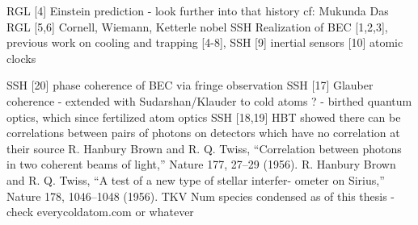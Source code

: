 		RGL [4] Einstein prediction - look further into that history cf: Mukunda Das 
	RGL [5,6] Cornell, Wiemann, Ketterle nobel 
	SSH  Realization of BEC [1,2,3], previous work on cooling and trapping [4-8], 
	SSH [9] inertial sensors [10] atomic clocks 
	
	
	SSH [20] phase coherence of BEC via fringe observation 
	SSH [17] Glauber coherence - extended with Sudarshan/Klauder to cold atoms ? - birthed quantum optics, which since fertilized atom optics 
	SSH [18,19] HBT showed there can be correlations between pairs of photons on detectors which have no correlation at their source  
	R. Hanbury Brown and R. Q. Twiss, “Correlation between photons in two coherent beams of light,” Nature 177, 27–29 (1956).
	R. Hanbury Brown and R. Q. Twiss, “A test of a new type of stellar interfer- ometer on Sirius,” Nature 178, 1046–1048 (1956).
	TKV Num species condensed as of this thesis - check everycoldatom.com or whatever 


